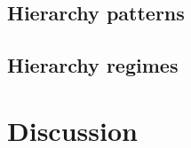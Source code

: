 \documentclass[english,fleqn,allpages]{ISTE_science}[2018/07/30]
\begin{document}
\subsection{Hierarchy patterns}


\subsection{Hierarchy regimes}









\section{Discussion}




















\end{document}
